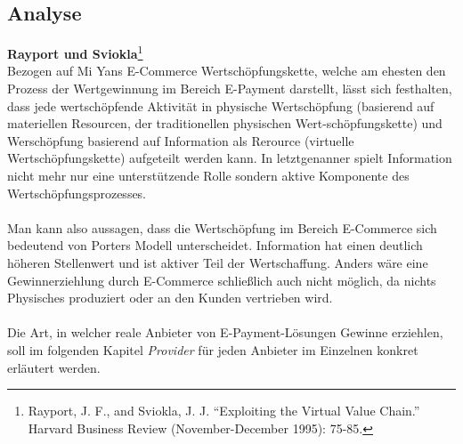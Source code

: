 \subsection{Analyse}
\textbf{Rayport und Sviokla}\footnote{Rayport, J. F., and Sviokla, J. J. “Exploiting the Virtual Value Chain.” Harvard Business Review (November-December 1995): 75-85.}\\
Bezogen auf Mi Yans E-Commerce Wertschöpfungskette, welche am ehesten den Prozess der Wertgewinnung im Bereich E-Payment darstellt, lässt sich festhalten, dass jede wertschöpfende Aktivität in physische Wertschöpfung (basierend auf materiellen Resourcen, der traditionellen physischen Wert-schöpfungskette) und Werschöpfung basierend auf Information als Rerource (virtuelle Wertschöpfungskette) aufgeteilt werden kann. In letztgenanner spielt Information nicht mehr nur eine unterstützende Rolle sondern aktive Komponente des Wertschöpfungsprozesses.\\
\\
Man kann also aussagen, dass die Wertschöpfung im Bereich E-Commerce sich bedeutend von Porters Modell unterscheidet. Information hat einen deutlich höheren Stellenwert und ist aktiver Teil der Wertschaffung. Anders wäre eine Gewinnerziehlung durch E-Commerce schließlich auch nicht möglich, da nichts Physisches produziert oder an den Kunden vertrieben wird.\\
\\
Die Art, in welcher reale Anbieter von E-Payment-Lösungen Gewinne erziehlen, soll im folgenden Kapitel \emph{Provider} für jeden Anbieter im Einzelnen konkret erläutert werden.
